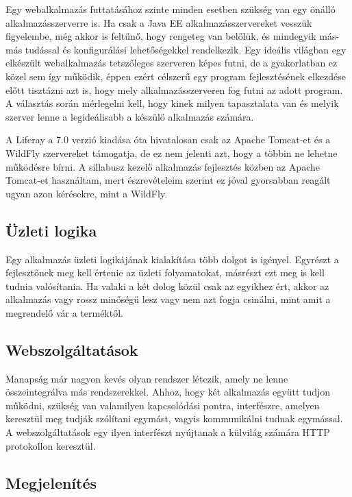 \documentclass[hidelinks, 12pt, a4paper]{report}
\begin{document}
Egy webalkalmazás futtatásához szinte minden esetben szükség van egy önálló alkalmazásszerverre is. Ha csak a Java EE alkalmazásszervereket vesszük figyelembe, még akkor is feltűnő, hogy rengeteg van belőlük, és mindegyik más-más tudással és konfigurálási lehetőségekkel rendelkezik. Egy ideális világban egy elkészült webalkalmazás tetszőleges szerveren képes futni, de a gyakorlatban ez közel sem így működik, éppen ezért célszerű egy program fejlesztésének elkezdése előtt tisztázni azt is, hogy mely alkalmazásszerveren fog futni az adott program. A választás során mérlegelni kell, hogy kinek milyen tapasztalata van és melyik szerver lenne a legideálisabb a készülő alkalmazás számára.

A Liferay a 7.0 verzió kiadása óta hivatalosan csak az Apache Tomcat-et és a WildFly szervereket támogatja, de ez nem jelenti azt, hogy a többin ne lehetne működésre bírni. A sillabusz kezelő alkalmazás fejlesztés közben az Apache Tomcat-et használtam, mert észrevételeim szerint ez jóval gyorsabban reagált ugyan azon kérésekre, mint a WildFly.

\subsection{Üzleti logika}

Egy alkalmazás üzleti logikájának kialakítása több dolgot is igényel. Egyrészt a fejlesztőnek meg kell értenie az üzleti folyamatokat, másrészt ezt meg is kell tudnia valósítania. Ha valaki a két dolog közül csak az egyikhez ért, akkor az alkalmazás vagy rossz minőségű lesz vagy nem azt fogja csinálni, mint amit a megrendelő vár a terméktől.

\subsection{Webszolgáltatások}

Manapság már nagyon kevés olyan rendszer létezik, amely ne lenne összeintegrálva más rendszerekkel. Ahhoz, hogy két alkalmazás együtt tudjon működni, szükség van valamilyen kapcsolódási pontra, interfészre, amelyen keresztül meg tudják szólítani egymást, vagyis kommunikálni tudnak egymással. A webszolgáltatások egy ilyen interfészt nyújtanak a külvilág számára HTTP protokollon keresztül.

\subsection{Megjelenítés}
\end{document}
